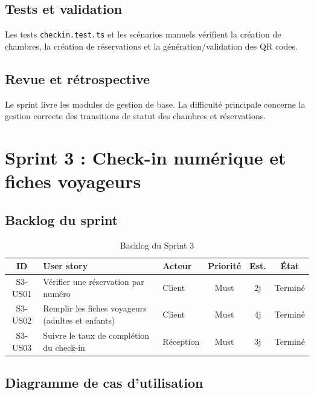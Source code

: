 \subsection{Tests et validation}
Les tests \texttt{checkin.test.ts} et les scénarios manuels vérifient la création de chambres, la création de réservations et la génération/validation des QR codes.

\subsection{Revue et rétrospective}
Le sprint livre les modules de gestion de base. La difficulté principale concerne la gestion correcte des transitions de statut des chambres et réservations.


\section{Sprint 3 : Check-in numérique et fiches voyageurs}
\label{sec:sprint3}

\subsection{Backlog du sprint}
\begin{table}[H]
\centering
\caption{Backlog du Sprint 3}
\small
\begin{tabularx}{\textwidth}{|c|X|p{2.2cm}|c|c|c|}
\hline
\textbf{ID} & \textbf{User story} & \textbf{Acteur} & \textbf{Priorité} & \textbf{Est.} & \textbf{État} \\ \hline
S3-US01 & Vérifier une réservation par numéro & Client & Must & 2j & Terminé \\ \hline
S3-US02 & Remplir les fiches voyageurs (adultes et enfants) & Client & Must & 4j & Terminé \\ \hline
S3-US03 & Suivre le taux de complétion du check-in & Réception & Must & 3j & Terminé \\ \hline
\end{tabularx}
\end{table}

\subsection{Diagramme de cas d'utilisation}

